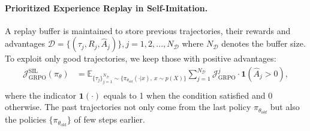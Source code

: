\documentclass[]{youtu} %
\begin{document}
\paragraph{Prioritized Experience Replay in Self-Imitation.}
A replay buffer is maintained to store previous trajectories, their rewards and advantages $\mathcal{D}=\{(\tau_{j}, R_{j}, \hat{A}_{j})\}, j=1,2,...,N_{\mathcal{D}}$ where $N_{\mathcal{D}}$ denotes the buffer size.
To exploit only good trajectories,
we keep those with positive advantages:
\begin{equation}
\begin{aligned}
\mathcal{J}_{\text{GRPO}}^{\text{SIL}}(\pi_\theta)&=
     \mathbb{E}_{\{\tau_{j}\}_{j=1}^{N_{\mathcal{D}}}\sim \{\pi_{\theta_{\text{old}}}(\cdot|x),\ x\sim p(X)\}}\sum_{j=1}^{N_{\mathcal{D}}}\mathcal{J}_{\text{GRPO}}^{j}\cdot\mathbf{1}(\hat{A}_{j}>0),\\
\end{aligned}
\end{equation}
where the indicator $\mathbf{1}(\cdot)$ equals to 1 when the condition satisfied and 0 otherwise.
The past trajectories not only come from the last policy $\pi_{\theta_{old}}$ but also the policies $\{\pi_{\theta_{\text{old}}}\}$ of few steps earlier.




\end{document}
